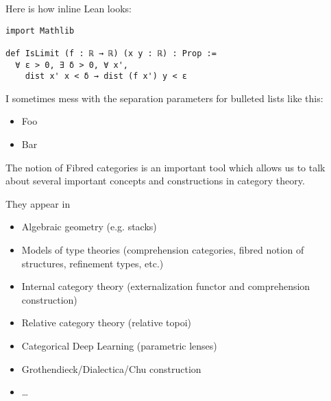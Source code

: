 \documentclass[landscape]{slides}
\begin{document}

\begin{slide}
  \restoregeometry
  Here is how inline Lean looks:
  \par{}\baselineskip
  \begin{lstlisting}
import Mathlib

def IsLimit (f : ℝ → ℝ) (x y : ℝ) : Prop :=
  ∀ ε > 0, ∃ δ > 0, ∀ x',
    dist x' x < δ → dist (f x') y < ε    
  \end{lstlisting}

  I sometimes mess with the separation parameters for bulleted lists like this:
  \begin{itemize}[itemsep=0cm,topsep=-0.5cm]
    \item Foo
    \item Bar
  \end{itemize}
\end{slide}


\begin{slide}
The notion of Fibred categories is an important tool which allows us to talk about several important concepts and constructions in category theory. 


They appear in 

\begin{itemize}[itemsep=0cm,topsep=-0.5cm]
 \item Algebraic geometry (e.g. stacks) 
 \item Models of type theories (comprehension categories, fibred notion of structures, refinement types, etc.)
 \item Internal category theory (externalization functor and comprehension construction)
 \item Relative category theory (relative topoi)
 \item Categorical Deep Learning (parametric lenses)
 \item Grothendieck/Dialectica/Chu construction 
 \item \ldots
\end{itemize}  
\end{slide}
\end{document}
